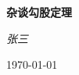 \begin{titlepage}
  \vspace*{\fill}
  \begin{center}
  \normalfont
  {\Huge\bfseries 杂谈勾股定理}

  \bigskip
  {\Large\itshape 张三}

  \medskip
  \today
  \end{center}
\end{titlepage}
